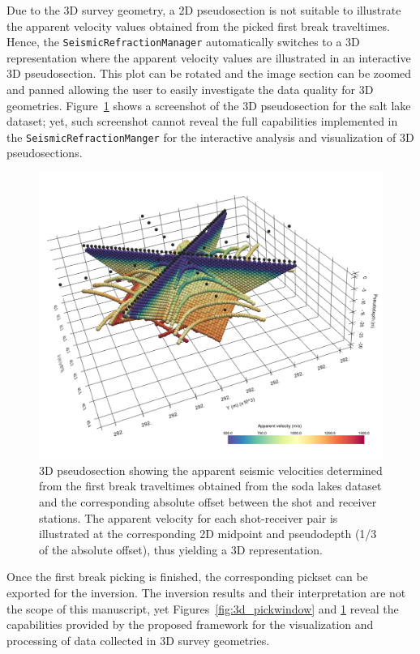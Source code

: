 \documentclass[a4paper,fleqn]{cas-sc}
\begin{document}
Due to the 3D survey geometry, a 2D pseudosection is not suitable 
to illustrate the apparent velocity values obtained from the picked first break traveltimes. Hence, 
the \texttt{SeismicRefractionManager} automatically switches to a 3D representation where the apparent velocity values are illustrated in an interactive 3D pseudosection. This plot can be rotated and the image section can be zoomed and panned allowing the user to easily investigate the data quality for 3D geometries. Figure~\ref{fig:3d_pseudosection} shows a screenshot of the 3D pseudosection for the salt lake dataset; yet, such screenshot cannot reveal the full capabilities implemented in the \texttt{SeismicRefractionManger} for the interactive analysis and visualization of 3D pseudosections.

\begin{figure}
	\centering
	\includegraphics[width=.75\textwidth]{figures/3d_pseudosection.pdf}
	\caption{3D pseudosection showing the apparent seismic velocities determined from the first break traveltimes obtained from the soda lakes dataset and the corresponding absolute offset between the shot and receiver stations. The apparent velocity for each shot-receiver pair is illustrated at the corresponding 2D midpoint and pseudodepth (1/3 of the absolute offset), thus yielding a 3D representation.}
	\label{fig:3d_pseudosection}
\end{figure}

Once the first break picking is finished, the corresponding pickset can be exported for the inversion.
The inversion results and their interpretation are not the scope of this manuscript, yet Figures~\ref{fig:3d_pickwindow} and \ref{fig:3d_pseudosection} reveal the capabilities provided by the proposed framework for the visualization and processing of data collected in 3D survey geometries.
\end{document}
